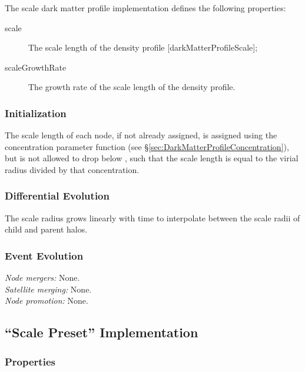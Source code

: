 The scale dark matter profile implementation defines the following properties:
\begin{description}
 \item [{\normalfont \ttfamily scale}] The scale length of the density profile [{\normalfont \ttfamily darkMatterProfileScale}];
 \item [{\normalfont \ttfamily scaleGrowthRate}] The growth rate of the scale length of the density profile.
\end{description}

\subsubsection{Initialization}

The scale length of each node, if not already assigned, is assigned using the concentration parameter function (see \S\ref{sec:DarkMatterProfileConcentration}), but is not allowed to drop below {\normalfont \ttfamily [darkMatterProfileMinimumConcentration]}, such that the scale length is equal to the virial radius divided by that concentration.

\subsubsection{Differential Evolution}

The scale radius grows linearly with time to interpolate between the scale radii of child and parent halos.

\subsubsection{Event Evolution}

\noindent\emph{Node mergers:} None.\\

\noindent\emph{Satellite merging:} None.\\

\noindent\emph{Node promotion:} None.\\

\subsection{``Scale Preset'' Implementation}\label{sec:DarkMatterProfileScalePreset}

\subsubsection{Properties}

